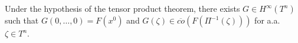 
Under the hypothesis of the tensor product theorem, there exists $G \in H^\infty(T^n)$ such that $G(0, \ldots, 0) = F(x^0)$ and $G(\zeta) \in \overline{co}(F(\Pi^{-1}(\zeta)))$ for a.a. $\zeta \in T^n$.
